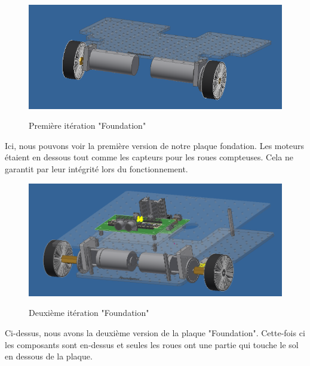 \documentclass[
	a4paper,									%
	11pt,										%
	twoside,									%
	openright,									%
	notitlepage,									%
	parskip=half,								%
]{scrreprt}										%
\begin{document}
\begin{figure}[!ht]
	\centering 
	\includegraphics[scale=.5]{img/FoundationV0.png}
	\label{FoundationV0}
	\caption{Première itération "Foundation"}	
\end{figure}

Ici, nous pouvons voir la première version de notre plaque fondation. Les moteurs étaient en dessous tout comme 
les capteurs pour les roues compteuses. Cela ne garantit par leur intégrité lors du fonctionnement. \par

\begin{figure}[!ht]
	\centering 
	\includegraphics[scale=.4]{img/FoundationV2.0.png}
	\label{FoundationV2}
	\caption{Deuxième itération "Foundation"}	
\end{figure}

Ci-dessus, nous avons la deuxième version de la plaque "Foundation". Cette-fois ci les composants sont en-dessus
et seules les roues ont une partie qui touche le sol en dessous de la plaque.
\end{document}

